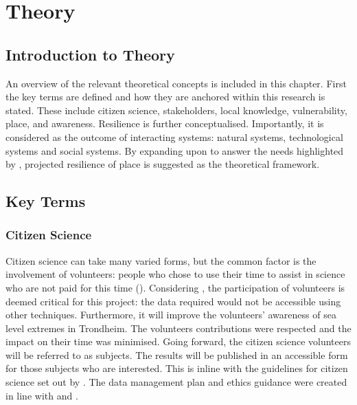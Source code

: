 
\chapter{Theory}

\section{Introduction to Theory}
An overview of the relevant theoretical concepts is included in this chapter. First the key terms are defined and how they are anchored within this research is stated. These include citizen science, stakeholders, local knowledge, vulnerability, place, and awareness. Resilience is further conceptualised. Importantly, it is considered as the outcome of interacting systems: natural systems, technological systems and social systems. By expanding upon \cite{cutter_place-based_2008} to answer the needs highlighted by \cite{rasanen_conceptualizing_2020}, projected resilience of place is suggested as the theoretical framework. 

\section{Key Terms}


\subsection{Citizen Science}
Citizen science can take many varied forms, but the common factor is the involvement of volunteers: people who chose to use their time to assist in science who are not paid for this time (\cite{pocock_choosing_2014}). Considering \cite{tweddle_guide_2012}, the participation of volunteers is deemed critical for this project: the data required would not be accessible using other techniques. Furthermore, it will improve the volunteers' awareness of sea level extremes in Trondheim.  The volunteers contributions were respected and the impact on their time was minimised. Going forward, the citizen science volunteers will be referred to as subjects. The results will be published in an accessible form for those subjects who are interested. This is inline with the guidelines for citizen science set out by \cite{tweddle_guide_2012}. The data management plan and ethics guidance were created in line with \cite{nesh_guidelines_2022} and \cite{nsd_norsk_nodate}. 

